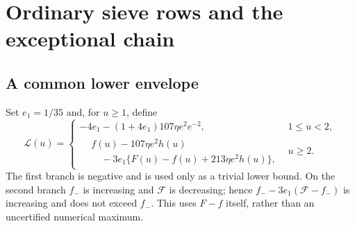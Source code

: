 \documentclass[11pt]{article}
\theoremstyle{definition}
\newcommand{\Fup}{\mathcal F}
\newcommand{\Flow}{\mathcal L}
\begin{document}
\section{Ordinary sieve rows and the exceptional chain}\label{sec:ordinary}

\subsection{A common lower envelope}

Set $e_1=1/35$ and, for $u\ge1$, define
\begin{equation}\label{eq:lower-envelope}
 \Flow(u)=\begin{cases}
 -4e_1-(1+4e_1)107\eta e^2e^{-2},&1\le u<2,\\
 \begin{aligned}
 &f(u)-107\eta e^2h(u)\\
 &\quad-3e_1\{F(u)-f(u)+213\eta e^2h(u)\},
 \end{aligned}&u\ge2.
 \end{cases}
\end{equation}
The first branch is negative and is used only as a trivial lower bound.
On the second branch $f_-$ is increasing and $\Fup$ is decreasing;
hence $f_--3e_1(\Fup-f_-)$ is increasing and does not exceed $f_-$.
This uses $F-f$ itself, rather than an uncertified numerical maximum.
\end{document}
